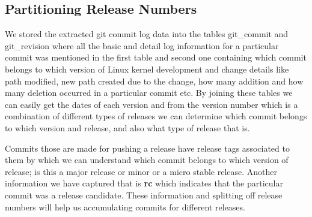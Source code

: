 \documentclass{acm_proc_article-sp}
\begin{document}
 \subsection{Partitioning Release Numbers}
We stored the extracted git commit log data into the tables git\_commit and git\_revision where all the basic and detail log information for a particular commit was mentioned in the first table and second one containing which commit belongs to which version of Linux kernel development and change details like path modified, new path created due to the change, how many addition and how many deletion occurred in a particular commit etc. By joining these tables we can easily get the dates of each version and from the version number which is a combination of different types of releases we can determine which commit belongs to which version and release, and also what type of release that is.

Commits those are made for pushing a release have release tags associated to them by which we can understand which commit belongs to which version of release; is this a major release or minor or a micro stable release. Another information we have captured that is \textbf{rc} which indicates that the particular commit was a release candidate. These information and splitting off release numbers will help us accumulating commits for different releases.
\end{document}
